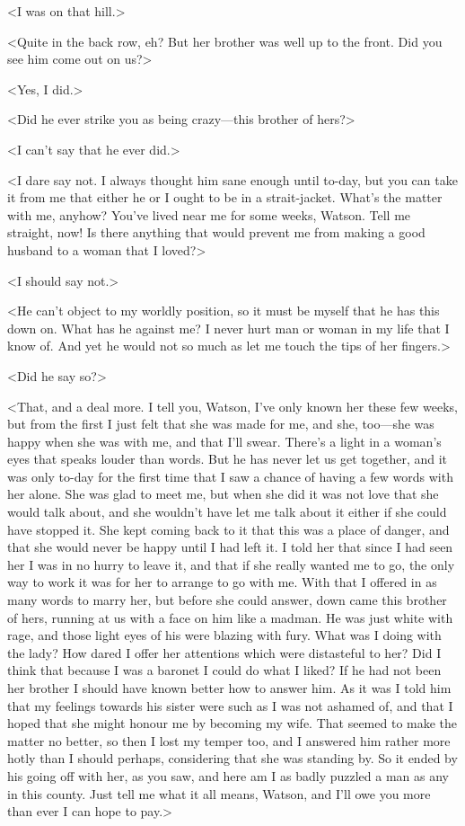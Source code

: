 <I was on that hill.>

<Quite in the back row, eh? But her brother was well up to the front. Did you see him come out on us?>

<Yes, I did.>

<Did he ever strike you as being crazy—this brother of hers?>

<I can't say that he ever did.>

<I dare say not. I always thought him sane enough until to-day, but you can take it from me that either he or I ought to be in a strait-jacket. What's the matter with me, anyhow? You've lived near me for some weeks, Watson. Tell me straight, now! Is there anything that would prevent me from making a good husband to a woman that I loved?>

<I should say not.>

<He can't object to my worldly position, so it must be myself that he has this down on. What has he against me? I never hurt man or woman in my life that I know of. And yet he would not so much as let me touch the tips of her fingers.>

<Did he say so?>

<That, and a deal more. I tell you, Watson, I've only known her these few weeks, but from the first I just felt that she was made for me, and she, too—she was happy when she was with me, and that I'll swear. There's a light in a woman's eyes that speaks louder than words. But he has never let us get together, and it was only to-day for the first time that I saw a chance of having a few words with her alone. She was glad to meet me, but when she did it was not love that she would talk about, and she wouldn't have let me talk about it either if she could have stopped it. She kept coming back to it that this was a place of danger, and that she would never be happy until I had left it. I told her that since I had seen her I was in no hurry to leave it, and that if she really wanted me to go, the only way to work it was for her to arrange to go with me. With that I offered in as many words to marry her, but before she could answer, down came this brother of hers, running at us with a face on him like a madman. He was just white with rage, and those light eyes of his were blazing with fury. What was I doing with the lady? How dared I offer her attentions which were distasteful to her? Did I think that because I was a baronet I could do what I liked? If he had not been her brother I should have known better how to answer him. As it was I told him that my feelings towards his sister were such as I was not ashamed of, and that I hoped that she might honour me by becoming my wife. That seemed to make the matter no better, so then I lost my temper too, and I answered him rather more hotly than I should perhaps, considering that she was standing by. So it ended by his going off with her, as you saw, and here am I as badly puzzled a man as any in this county. Just tell me what it all means, Watson, and I'll owe you more than ever I can hope to pay.>

